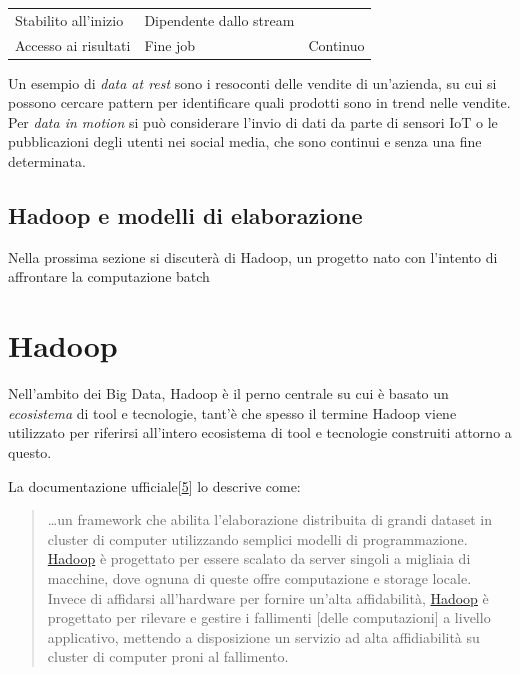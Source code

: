 \documentclass[italian,a4paper, twoside, 12pt]{report}
\begin{document}
\begin{longtable}[]{@{}lll@{}}
\begin{minipage}[t]{0.21\columnwidth}
Stabilito all'inizio\strut
\end{minipage} & \begin{minipage}[t]{0.43\columnwidth}\raggedright\strut
Dipendente dallo stream\strut
\end{minipage}\tabularnewline
\begin{minipage}[t]{0.27\columnwidth}\raggedright\strut
Accesso ai risultati\strut
\end{minipage} & \begin{minipage}[t]{0.21\columnwidth}\raggedright\strut
Fine job\strut
\end{minipage} & \begin{minipage}[t]{0.43\columnwidth}\raggedright\strut
Continuo\strut
\end{minipage}\tabularnewline
\bottomrule
\end{longtable}

Un esempio di \emph{data at rest} sono i resoconti delle vendite di
un'azienda, su cui si possono cercare pattern per identificare quali
prodotti sono in trend nelle vendite. Per \emph{data in motion} si può
considerare l'invio di dati da parte di sensori IoT o le pubblicazioni
degli utenti nei social media, che sono continui e senza una fine
determinata.

\section{Hadoop e modelli di
elaborazione}\label{hadoop-e-modelli-di-elaborazione}

Nella prossima sezione si discuterà di Hadoop, un progetto nato con
l'intento di affrontare la computazione batch

\hypertarget{hadoop}{\chapter{Hadoop}\label{hadoop}}

Nell'ambito dei Big Data, Hadoop è il perno centrale su cui è basato un
\emph{ecosistema} di tool e tecnologie, tant'è che spesso il termine
Hadoop viene utilizzato per riferirsi all'intero ecosistema di tool e
tecnologie construiti attorno a questo.

La documentazione
ufficiale{[}\protect\hyperlink{ref-hadoop-doc-main}{5}{]} lo descrive
come:

\begin{quote}
\ldots{}un framework che abilita l'elaborazione distribuita di grandi
dataset in cluster di computer utilizzando semplici modelli di
programmazione. \protect\hyperlink{hadoop}{Hadoop} è progettato per
essere scalato da server singoli a migliaia di macchine, dove ognuna di
queste offre computazione e storage locale. Invece di affidarsi
all'hardware per fornire un'alta affidabilità,
\protect\hyperlink{hadoop}{Hadoop} è progettato per rilevare e gestire i
fallimenti {[}delle computazioni{]} a livello applicativo, mettendo a
disposizione un servizio ad alta affidiabilità su cluster di computer
proni al fallimento.
\end{quote}
\end{document}
